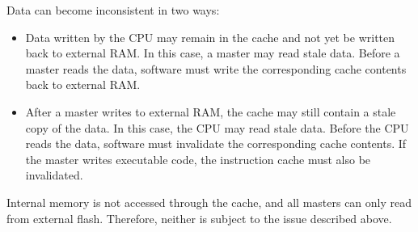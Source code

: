 \documentclass[main\_\_EN.tex]{subfiles}
\begin{document}
Data can become inconsistent in two ways:

\begin{itemize}
    \item Data written by the CPU may remain in the cache and not yet be written back to external RAM. In this case, a master may read stale data. Before a master reads the data, software must write the corresponding cache contents back to external RAM.
    \item After a master writes to external RAM, the cache may still contain a stale copy of the data. In this case, the CPU may read stale data. Before the CPU reads the data, software must invalidate the corresponding cache contents. If the master writes executable code, the instruction cache must also be invalidated.
\end{itemize}

Internal memory is not accessed through the cache, and all masters can only read from external flash. Therefore, neither is subject to the issue described above.
\end{document}
